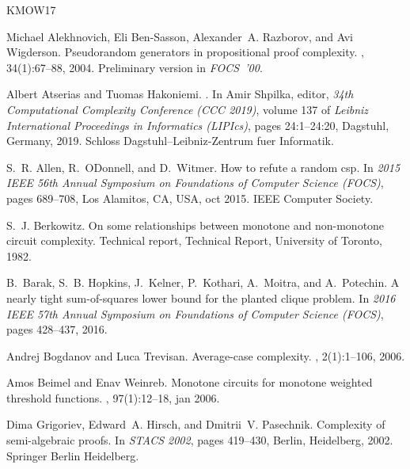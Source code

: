 \documentclass[10pt,a4paper]{article}
\theoremstyle{plain}
\theoremstyle{remark}
\theoremstyle{definition}
\begin{document}
\newcommand{\etalchar}[1]{$^{#1}$}
\begin{thebibliography}{KMOW17}

Michael Alekhnovich, Eli {Ben-Sasson}, Alexander~A. Razborov, and Avi
  Wigderson.
\newblock Pseudorandom generators in propositional proof complexity.
, 34(1):67\nobreakdash--88, 2004.
\newblock Preliminary version in \emph{FOCS~'00}.

Albert Atserias and Tuomas Hakoniemi.
.
\newblock In Amir Shpilka, editor, {\em 34th Computational Complexity
  Conference (CCC 2019)}, volume 137 of {\em Leibniz International Proceedings
  in Informatics (LIPIcs)}, pages 24:1--24:20, Dagstuhl, Germany, 2019. Schloss
  Dagstuhl--Leibniz-Zentrum fuer Informatik.

S.~R. Allen, R.~ODonnell, and D.~Witmer.
\newblock How to refute a random csp.
\newblock In {\em 2015 IEEE 56th Annual Symposium on Foundations of Computer
  Science (FOCS)}, pages 689--708, Los Alamitos, CA, USA, oct 2015. IEEE
  Computer Society.

S.~J. Berkowitz.
\newblock On some relationships between monotone and non-monotone circuit
  complexity.
\newblock Technical report, Technical Report, University of Toronto, 1982.

\bibitem[BHK{\etalchar{+}}16]{BHKKMP16clique}
B.~{Barak}, S.~B. {Hopkins}, J.~{Kelner}, P.~{Kothari}, A.~{Moitra}, and
  A.~{Potechin}.
\newblock A nearly tight sum-of-squares lower bound for the planted clique
  problem.
\newblock In {\em 2016 IEEE 57th Annual Symposium on Foundations of Computer
  Science (FOCS)}, pages 428--437, 2016.

Andrej Bogdanov and Luca Trevisan.
\newblock Average-case complexity.
,
  2(1):1--106, 2006.

Amos Beimel and Enav Weinreb.
\newblock Monotone circuits for monotone weighted threshold functions.
, 97(1):12–18, jan 2006.

Dima Grigoriev, Edward~A. Hirsch, and Dmitrii~V. Pasechnik.
\newblock Complexity of semi-algebraic proofs.
\newblock In {\em STACS 2002}, pages 419--430, Berlin, Heidelberg, 2002.
  Springer Berlin Heidelberg.


\end{thebibliography}
\end{document}
